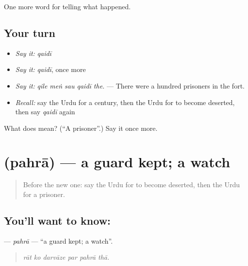 \begin{grammarlens}[title={What you've built}]
One more word for telling what happened.
\end{grammarlens}

\subsection*{Your turn}
\begin{itemize}
\raggedright
  \item \emph{Say it:} \emph{qaidī}
  \item \emph{Say it:} \emph{qaidī}, once more
  \item \emph{Say it:} \emph{qile meṅ sau qaidī the.} — There were a hundred prisoners in the fort.
  \item \emph{Recall:} say the Urdu for a century, then the Urdu for to become deserted, then say \emph{qaidī} again
\end{itemize}

\begin{tcolorbox}[breakable,colback=teal!4,colframe=teal!35!black,title={Before you move on}]
What does  mean? (\textquotedblleft{}A prisoner\textquotedblright{}.) Say it once more.
\end{tcolorbox}
\section[\texorpdfstring{\ur{پہرہ} (pahrā)}{پہرہ (pahrā)}]{ (pahrā) — a guard kept; a watch}

\label{lesson:UR-C316-pahra}



\begin{quote}
Before the new one: say the Urdu for to become deserted, then the Urdu for a prisoner.
\end{quote}

\subsection*{You'll want to know: }
\textbf{} — \emph{pahrā} — \textquotedblleft{}a guard kept; a watch\textquotedblright{}.

\begin{quote}
     
\end{quote}

\begin{quote}
\emph{rāt ko darvāze par pahrā thā.}
\end{quote}

